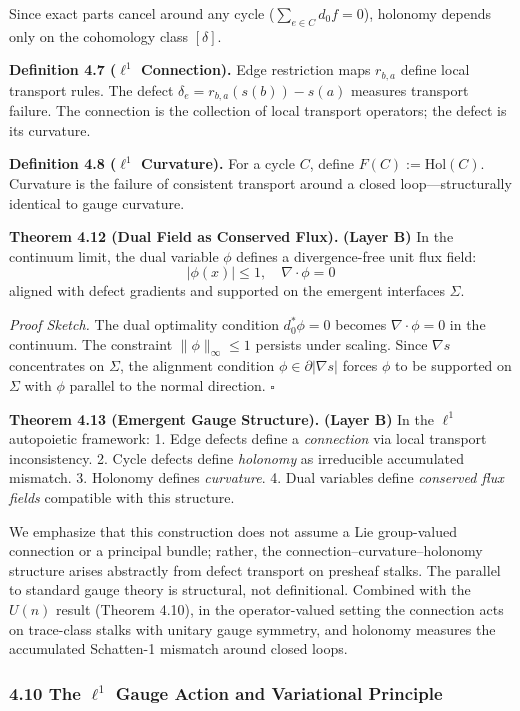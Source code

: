 \documentclass[
]{article}
\begin{document}
Since exact parts cancel around any cycle
(\(\sum_{e \in C} d_0 f = 0\)), holonomy depends only on the cohomology
class \([\delta]\).

\textbf{Definition 4.7 (\(\ell^1\) Connection).} Edge restriction maps
\(r_{b,a}\) define local transport rules. The defect
\(\delta_e = r_{b,a}(s(b)) - s(a)\) measures transport failure. The
connection is the collection of local transport operators; the defect is
its curvature.

\textbf{Definition 4.8 (\(\ell^1\) Curvature).} For a cycle \(C\),
define \(F(C) := \mathrm{Hol}(C)\). Curvature is the failure of
consistent transport around a closed loop---structurally identical to
gauge curvature.

\textbf{Theorem 4.12 (Dual Field as Conserved Flux).} \textbf{(Layer B)}
In the continuum limit, the dual variable \(\phi\) defines a
divergence-free unit flux field:
\[ |\phi(x)| \le 1, \quad \nabla \cdot \phi = 0 \] aligned with defect
gradients and supported on the emergent interfaces \(\Sigma\).

\emph{Proof Sketch.} The dual optimality condition \(d_0^* \phi = 0\)
becomes \(\nabla \cdot \phi = 0\) in the continuum. The constraint
\(\|\phi\|_\infty \le 1\) persists under scaling. Since \(\nabla s\)
concentrates on \(\Sigma\), the alignment condition
\(\phi \in \partial |\nabla s|\) forces \(\phi\) to be supported on
\(\Sigma\) with \(\phi\) parallel to the normal direction. \(\square\)

\textbf{Theorem 4.13 (Emergent Gauge Structure).} \textbf{(Layer B)} In
the \(\ell^1\) autopoietic framework: 1. Edge defects define a
\emph{connection} via local transport inconsistency. 2. Cycle defects
define \emph{holonomy} as irreducible accumulated mismatch. 3. Holonomy
defines \emph{curvature}. 4. Dual variables define \emph{conserved flux
fields} compatible with this structure.

We emphasize that this construction does not assume a Lie group-valued
connection or a principal bundle; rather, the
connection--curvature--holonomy structure arises abstractly from defect
transport on presheaf stalks. The parallel to standard gauge theory is
structural, not definitional. Combined with the \(U(n)\) result (Theorem
4.10), in the operator-valued setting the connection acts on trace-class
stalks with unitary gauge symmetry, and holonomy measures the
accumulated Schatten-1 mismatch around closed loops.

\subsubsection{\texorpdfstring{4.10 The \(\ell^1\) Gauge Action and
Variational
Principle}{4.10 The \textbackslash ell\^{}1 Gauge Action and Variational Principle}}\label{the-ell1-gauge-action-and-variational-principle}
\end{document}
